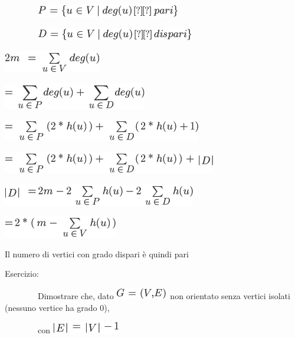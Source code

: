 \documentclass{article}
\begin{document}
{~~~~~~~~}\includegraphics{images/image367.png}

{~~~~~~~~}\includegraphics{images/image368.png}

{}

\includegraphics{images/image369.png}

\includegraphics{images/image370.png}{~}

\includegraphics{images/image371.png}{~}

\includegraphics{images/image372.png}{~}

{}

\includegraphics{images/image373.png}

\includegraphics{images/image374.png}{~}

{Il numero di vertici con grado dispari è quindi pari}

{}

{Esercizio}{: }

{~~~~~~~~Dimostrare che, dato
}\includegraphics{images/image335.png}{~non orientato senza vertici
isolati (nessuno vertice ha grado 0),}

{~~~~~~~~con }\includegraphics{images/image375.png}
\end{document}
